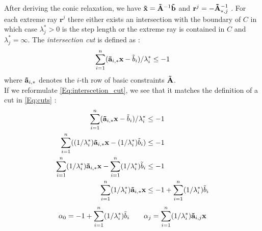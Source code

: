 After deriving the conic relaxation, we have $\bold{\tilde x} = \bold{\tilde A}^{-1} \bold{\tilde b}$ and $\mathbf r^j= - \bold{\tilde A}^{-1}_{*,j}$ \cite{bienstock_outer_product_free_sets}. For each extreme ray $\mathbf r^j$ there either exists an intersection with the boundary of $C$ in which case $\lambda^*_j > 0$ is the step length or the extreme ray is contained in $C$ and $\lambda^*_j= \infty$.
The \textit{intersection cut} is defined as \cite{bienstock_outer_product_free_sets}:
\begin{equation} \label{Eq:interscetion_cut}
    \sum_{i=1}^n (\bold{\tilde a}_{i,*} \mathbf x - \tilde b_i)/ \lambda_i^* \leq -1
\end{equation}
 where $\bold{\tilde a}_{i,*}$ denotes the $i$-th row of basic constraints $\bold{\tilde A}$.\\
If we reformulate \cref{Eq:interscetion_cut}, we see that it matches the definition of a cut in \cref{Eq:cuts} \cite{bienstock_outer_product_free_sets}:
\begin{align}
    \sum_{i=1}^n (\bold{\tilde a}_{i,*} \mathbf x - \tilde b_i)/ \lambda_i^* &\leq -1 \\
    \sum_{i=1}^n ((1/ \lambda_i^*) \bold{\tilde a}_{i,*} \mathbf x - (1/ \lambda_i^*)\tilde b_i) &\leq -1 \\ 
    \sum_{i=1}^n (1/ \lambda_i^*) \bold{\tilde a}_{i,*} \mathbf x - \sum_{i=1}^n  (1/ \lambda_i^*)\tilde b_i &\leq -1 \\
    \sum_{i=1}^n (1/ \lambda_i^*) \bold{\tilde a}_{i,*} \mathbf x & \leq -1 + \sum_{i=1}^n  (1/ \lambda_i^*)\tilde b_i
\end{align}
\begin{equation*}
    \alpha_0 = -1 + \sum_{i=1}^n  (1/ \lambda_i^*)\tilde b_i \quad \quad \alpha_j = \sum_{i=1}^n (1/ \lambda_i^*) \bold{\tilde a}_{i,j} \mathbf x
\end{equation*}


